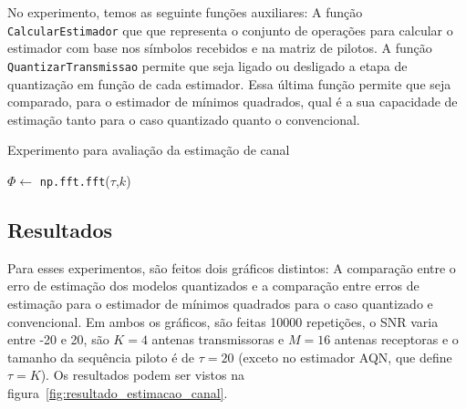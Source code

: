 \documentclass{article}
\begin{document}
No experimento, temos as seguinte funções auxiliares: A função \texttt{CalcularEstimador} que que representa o conjunto de operações para calcular o estimador com base nos símbolos recebidos e na matriz de pilotos. A função \texttt{QuantizarTransmissao} permite que seja ligado ou desligado a etapa de quantização em função de cada estimador. Essa última função permite que seja comparado, para o estimador de mínimos quadrados, qual é a sua capacidade de estimação tanto para o caso quantizado quanto o convencional. 

\begin{algorithm}
    \label{alg:estimacao_canal}
    \caption{Experimento para avaliação da estimação de canal}
    $\Phi\gets$ \texttt{np.fft.fft}($\tau$,$k$)
    \For{$i=0;\; i <$ Repetições$;\; i=i+1$}{
        $H\gets$\texttt{GerarCanal($m$,$k$)}\;
        \For{$SNR$ em $ListaSNR$}{
            \For{$estimador$ em $ListaEstimadores$}{
                \Comment{Transmissão da matriz Piloto}
                $Y_p\gets$ \texttt{TransmitirMIMO}($H$,$\Phi$)\;
                $Quantizar \gets$ \texttt{QuantizarTransmissao}($estimador$)\;
                \If{$Quantizar$}{
                    $R_p \gets$ \texttt{Quantizar}($Y_p$)\;
                }\Else{
                    $R_p \gets Y_p$\;
                }
                \Comment{Calculo do erro de estimação}
                $\hat{H}\gets$ \texttt{CalcularEstimador($R_p$,$\Phi$,$estimador$)}\;
                $NMSE\gets (\texttt{SomarElementos(}||H-\hat{H}||_2^2\texttt{)})/mk$\;
                $NMSE_{dB}\gets 10*log(NMSE)$\;
                $resultados$\texttt{.concatenar(}$[i,SNR,estimador,NMSE_{dB}]]$\texttt{)}\;
            }
        }
    }
\end{algorithm}

\subsection{Resultados}

Para esses experimentos, são feitos dois gráficos distintos: A comparação entre o erro de estimação dos modelos quantizados e a comparação entre erros de estimação para o estimador de mínimos quadrados para o caso quantizado e convencional. Em ambos os gráficos, são feitas 10000 repetições, o SNR varia entre -20 e 20, são $K=4$ antenas transmissoras e $M=16$ antenas receptoras e o tamanho da sequência piloto é de $\tau=20$ (exceto no estimador AQN, que define $\tau=K$). Os resultados podem ser vistos na figura~\ref{fig:resultado_estimacao_canal}. 
\end{document}
